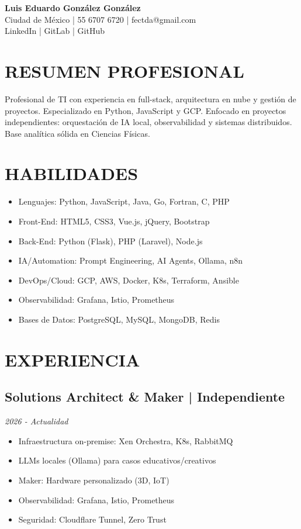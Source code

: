 \documentclass[10pt]{article}
\begin{document}
\begin{center}
{\LARGE\bfseries Luis Eduardo González González}\\
Ciudad de México | 55 6707 6720 | fectda@gmail.com\\
LinkedIn | GitLab | GitHub
\end{center}

\section{RESUMEN PROFESIONAL}
Profesional de TI con experiencia en full-stack, arquitectura en nube y gestión de proyectos. Especializado en Python, JavaScript y GCP. Enfocado en proyectos independientes: orquestación de IA local, observabilidad y sistemas distribuidos. Base analítica sólida en Ciencias Físicas.

\section{HABILIDADES}
\begin{itemize}
    \item Lenguajes: Python, JavaScript, Java, Go, Fortran, C, PHP
    \item Front-End: HTML5, CSS3, Vue.js, jQuery, Bootstrap
    \item Back-End: Python (Flask), PHP (Laravel), Node.js
    \item IA/Automation: Prompt Engineering, AI Agents, Ollama, n8n
    \item DevOps/Cloud: GCP, AWS, Docker, K8s, Terraform, Ansible
    \item Observabilidad: Grafana, Istio, Prometheus
    \item Bases de Datos: PostgreSQL, MySQL, MongoDB, Redis
\end{itemize}

\section{EXPERIENCIA}
\subsection{Solutions Architect \& Maker | Independiente}
\textit{2026 - Actualidad}
\begin{itemize}
    \item Infraestructura on-premise: Xen Orchestra, K8s, RabbitMQ
    \item LLMs locales (Ollama) para casos educativos/creativos
    \item Maker: Hardware personalizado (3D, IoT)
    \item Observabilidad: Grafana, Istio, Prometheus
    \item Seguridad: Cloudflare Tunnel, Zero Trust
\end{itemize}
\end{document}
